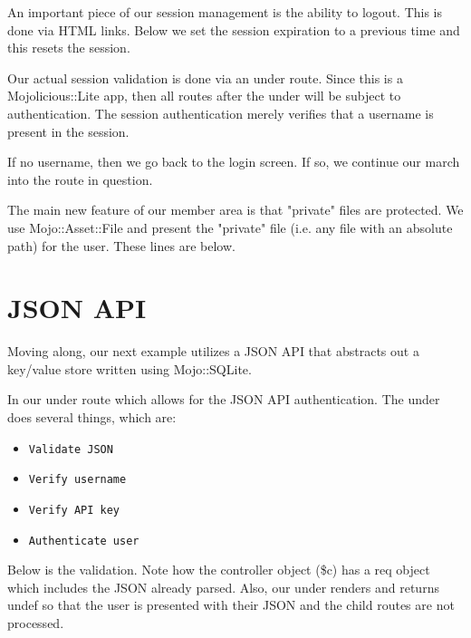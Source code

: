\documentclass[14pt]{extreport}
\begin{document}
An important piece of our session management is the ability to logout.  This is
done via HTML links.  Below we set the session expiration to a previous time
and this resets the session.

\clearpage



Our actual session validation is done via an under route.  Since this is a
Mojolicious::Lite app, then all routes after the under will be subject to
authentication.  The session authentication merely verifies that a username is
present in the session.

If no username, then we go back to the login screen.  If so, we continue our
march into the route in question.



The main new feature of our member area is that "private" files are protected.
We use Mojo::Asset::File and present the "private" file (i.e. any file with an
absolute path) for the user.  These lines are below.



\section{JSON API}

Moving along, our next example utilizes a JSON API that abstracts out a
key/value store written using Mojo::SQLite.

In our under route which allows for the JSON API authentication.  The under
does several things, which are:

\begin{itemize} \itemsep1pt \parskip0pt 
\item \verb|Validate JSON|
\item \verb|Verify username|
\item \verb|Verify API key|
\item \verb|Authenticate user|
\end{itemize}

Below is the validation.  Note how the controller object (\$c) has a req object
which includes the JSON already parsed.  Also, our under renders and returns
undef so that the user is presented with their JSON and the child routes are
not processed.
\end{document}
